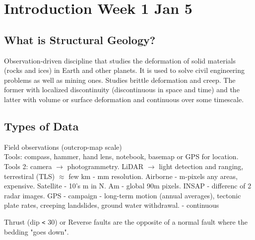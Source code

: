 \documentclass[12pt,a4paper]{report}
\author{Omar Gonzalez}
\begin{document}
\section*{Introduction Week 1 Jan 5}
\subsection*{What is Structural Geology?}
Observation-driven discipline that studies the deformation of solid materials (rocks and ices) in Earth and other planets.
It is used to solve civil engineering problems as well as mining ones.
Studies brittle deformation and creep. The former with localized discontinuity (discontinuous in space and time) and the latter with volume or surface deformation and continuous over some timescale.

\subsection*{Types of Data}
Field observations (outcrop-map scale)\\
\indent Tools: compass, hammer, hand lens, notebook, basemap or GPS for location.\\
\indent Tools 2: camera $\rightarrow$ photogrammetry. LiDAR $\rightarrow$ light detection and ranging, terrestiral (TLS) $\approx$ few km - mm resolution. Airborne - m-pixels any areas, expensive. Satellite - 10's m in N. Am - global 90m pixels. INSAP - differenc of 2 radar images.
GPS - campaign - long-term motion (annual averages), tectonic plate rates, creeping landslides, ground water withdrawal.
    - continuous

Thrust (dip \verb|<| 30) or Reverse faults are the opposite of a normal fault where the bedding "goes down".
\end{document}
